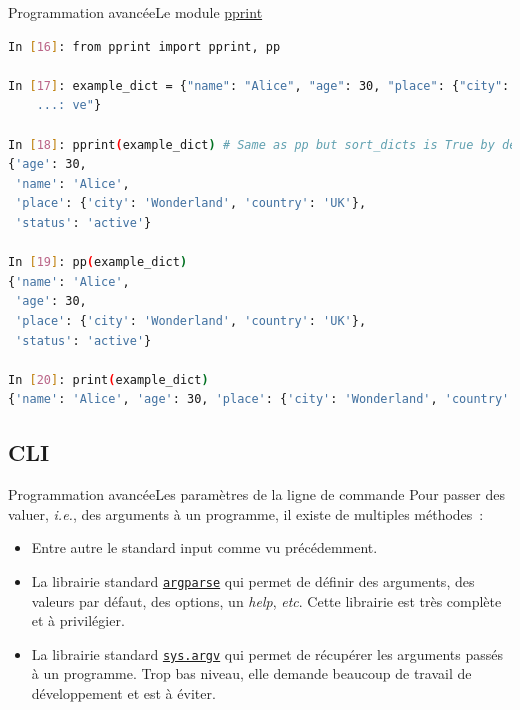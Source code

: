 \documentclass{beamer}
\begin{document}
    \begin{frame}[fragile]{Programmation avancée}{Le module \href{https://docs.python.org/fr/3/library/pprint.html}{pprint}}
        \begin{lstlisting}[language=Bash]
In [16]: from pprint import pprint, pp

In [17]: example_dict = {"name": "Alice", "age": 30, "place": {"city": "Wonderland", "country": "UK"}, "status": "acti
    ...: ve"}

In [18]: pprint(example_dict) # Same as pp but sort_dicts is True by default
{'age': 30,
 'name': 'Alice',
 'place': {'city': 'Wonderland', 'country': 'UK'},
 'status': 'active'}

In [19]: pp(example_dict)
{'name': 'Alice',
 'age': 30,
 'place': {'city': 'Wonderland', 'country': 'UK'},
 'status': 'active'}

In [20]: print(example_dict)
{'name': 'Alice', 'age': 30, 'place': {'city': 'Wonderland', 'country': 'UK'}, 'status': 'active'}
        \end{lstlisting}
    \end{frame}

    \subsection{CLI}\label{subsec:cli}

    \begin{frame}{Programmation avancée}{Les paramètres de la ligne de commande}
        Pour passer des valuer, \textit{i.e.}, des arguments à un programme, il existe de multiples méthodes~:
        \begin{itemize}
            \item Entre autre le standard input comme vu précédemment.
            \item La librairie standard \href{https://docs.python.org/3/library/argparse.html}{\lstinline{argparse}} qui permet de définir des arguments, des valeurs par défaut, des options, un \textit{help}, \textit{etc}.
            Cette librairie est très complète et à privilégier.
            \item La librairie standard \href{https://docs.python.org/3/library/sys.html\#sys.argv}{\lstinline{sys.argv}} qui permet de récupérer les arguments passés à un programme.
            Trop bas niveau, elle demande beaucoup de travail de développement et est à éviter.
        \end{itemize}
    \end{frame}
\end{document}
